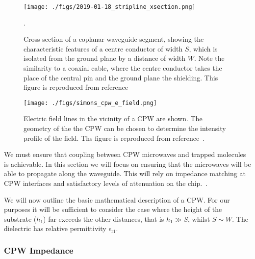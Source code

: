 
\begin{figure}
  \texttt{[image: ./figs/2019-01-18\_stripline\_xsection.png]}
  \caption{
    Cross section of a coplanar waveguide segment, showing the characteristic
    features of a centre conductor of width $S$, which is isolated from the
    ground plane by a distance of width $W$. Note the similarity to a coaxial
    cable, where the centre conductor takes the place of the central pin and the
    ground plane the shielding. This figure is reproduced from
    reference~\cite{Simons2004}}.
  \label{experiment:fig:CPWxsec}
\end{figure}


\begin{figure}
  \texttt{[image: ./figs/simons\_cpw\_e\_field.png]}
  \caption{
    Electric field lines in the vicinity of a CPW are shown. The geometry of the 
    the CPW can be chosen to determine the intensity profile of the field. Ths
    figure is reproduced from reference~\cite{Simons2004}.
  }
  \label{experiment:fig:CPWfield}
\end{figure}

We must ensure that coupling between CPW microwaves and trapped molecules is
achievable. In this section we will focus on ensuring that the microwaves will
be able to propagate along the waveguide. This will rely on impedance matching
at CPW interfaces and satisfactory levels of attenuation on the
chip.~\cite{Jackson1975, Simons2004}.

We will now outline the basic mathematical description of a CPW.  For our
purposes it will be sufficient to consider the case where the height of the
substrate ($h_1$) far exceeds the other distances, that is $h_1 \gg S$, whilst
$S \sim W$. The dielectric has relative permittivity $\epsilon_\mathrm{r1}$.

\subsubsection{CPW Impedance}

